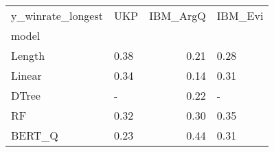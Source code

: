 \begin{tabular}{llrl}
\toprule
y\_winrate\_longest &   UKP &  IBM\_ArgQ & IBM\_Evi \\
model  &       &           &         \\
\midrule
Length &  0.38 &      0.21 &    0.28 \\
Linear &  0.34 &      0.14 &    0.31 \\
DTree  &     - &      0.22 &       - \\
RF     &  0.32 &      0.30 &    0.35 \\
BERT\_Q &  0.23 &      0.44 &    0.31 \\
\bottomrule
\end{tabular}
